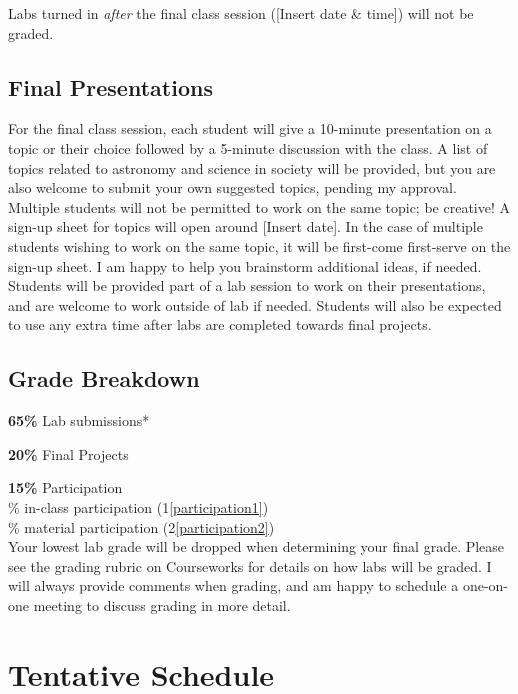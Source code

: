 \documentclass[11pt]{article}
\begin{document}
Labs turned in \textit{after} the final class session ([Insert date \& time]) will not be graded. 

\smallskip

\subsection*{Final Presentations}

\noindent For the final class session, each student will give a 10-minute presentation on a topic or their choice followed by a 5-minute discussion with the class. A list of topics related to astronomy and science in society will be provided, but you are also welcome to submit your own suggested topics, pending my approval. \\

Multiple students will not be permitted to work on the same topic; be creative! A sign-up sheet for topics will open around [Insert date]. In the case of multiple students wishing to work on the same topic, it will be first-come first-serve on the sign-up sheet. I am happy to help you brainstorm additional ideas, if needed. Students will be provided part of a lab session to work on their presentations, and are welcome to work outside of lab if needed. Students will also be expected to use any extra time after labs are completed towards final projects. \\

\subsection*{Grade Breakdown}

\noindent \textbf{65\%} Lab submissions*

\noindent \textbf{20\%} Final Projects

\noindent \textbf{15\%} Participation \\
\% in-class participation (1\ref{participation1}) \\
\% material participation (2\ref{participation2}) \\

\noindent *Your lowest lab grade will be dropped when determining your final grade. Please see the grading rubric on Courseworks for details on how labs will be graded. I will always provide comments when grading, and am happy to schedule a one-on-one meeting to discuss grading in more detail.

\section*{Tentative Schedule}
\end{document}
